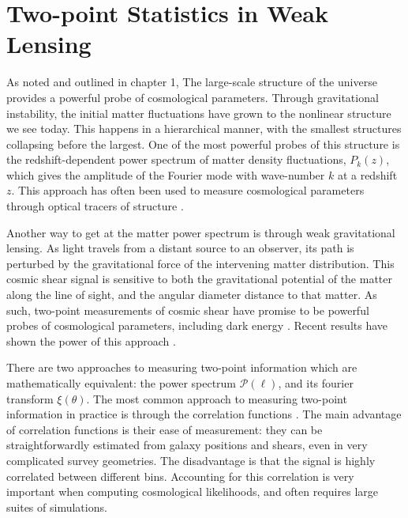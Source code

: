 \section{Two-point Statistics in Weak Lensing}
\label{sec:lensing_intro}
As noted and outlined in chapter 1,
The large-scale structure of the universe provides a powerful probe of
cosmological parameters.  Through gravitational instability, the initial
matter fluctuations have grown to the nonlinear structure we see today.
This happens in a hierarchical manner, with the smallest structures
collapsing before the largest.  One of the most powerful probes of this
structure is the redshift-dependent power spectrum of matter density
fluctuations, $P_k(z)$, which gives the amplitude of the
Fourier mode with wave-number $k$ at a redshift $z$. 
This approach has often been used to measure cosmological parameters
through optical tracers of structure \citep{Tegmark06}.

Another way to get at the matter power spectrum is through weak gravitational
lensing.  As light travels from a distant source to an observer, its path is
perturbed by the gravitational force of the intervening matter distribution.
This cosmic shear signal is sensitive to both the gravitational potential
of the matter along the line of sight, and the angular diameter distance
to that matter.  As such, two-point measurements of cosmic shear have promise
to be powerful probes of cosmological parameters, including dark energy
\citep[see][]{Takada07}.  Recent results have shown the power of this
approach \citep{Ichiki09, Schrabback10}.

There are two approaches to measuring two-point information which are 
mathematically equivalent: the power spectrum $\mathcal{P}(\ell)$,
and its fourier transform $\xi(\theta)$.
The most common approach to measuring two-point information in practice
is through the correlation functions \citep[see][]{Schneider02}.
The main advantage of correlation functions is their ease of measurement:
they can be straightforwardly estimated from galaxy positions and shears,
even in very complicated survey geometries.  The disadvantage is that the
signal is highly correlated between different bins.  Accounting for this 
correlation is very important when computing cosmological likelihoods,
and often requires large suites of simulations.

